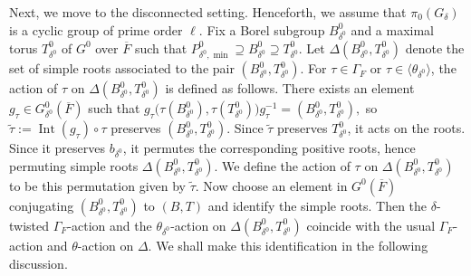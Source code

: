 \documentclass[11pt,letterpaper]{amsart}
\numberwithin{equation}{section}
\begin{document}
Next, we move to the disconnected setting. Henceforth, we assume that $\pi_0(G_{\delta})$ is a cyclic group of prime order $\ell$. 
Fix a Borel subgroup $B^0_{\delta^0}$ and a maximal torus $T^0_{\delta^0}$ of $G^0$ over $\overline{F}$ such that
$
P_{\delta^0,\min}^0 \supseteq B^0_{\delta^0} \supseteq T^0_{\delta^0}.$
Let $\Delta(B^0_{\delta^0},T^0_{\delta^0})$ denote the set of simple roots associated to the pair $(B^0_{\delta^0},T^0_{\delta^0})$.
For $\tau \in \Gamma_F$ or $\tau \in \langle \theta_{\delta^0} \rangle$, the action of $\tau$ on $\Delta(B^0_{\delta^0},T^0_{\delta^0})$ is defined as follows. There exists an element $g_{\tau} \in G_{\delta^0}^0(\overline{F})$ such that
$
g_{\tau}\bigl(\tau(B^0_{\delta^0}),\tau(T^0_{\delta^0})\bigr)g_{\tau}^{-1}
=
(B^0_{\delta^0},T^0_{\delta^0}),
$ so $\widetilde{\tau}:= \operatorname{Int}(g_{\tau}) \circ \tau$ preserves $(B^0_{\delta^0},T^0_{\delta^0})$. Since $\widetilde{\tau}$ preserves $T^0_{\delta^0}$, it acts on the roots. Since it preserves $b_{\delta^0}$, it permutes the corresponding positive roots, hence permuting simple roots $\Delta(B^0_{\delta^0},T^0_{\delta^0})$. We define the action of  $\tau$ on $\Delta(B^0_{\delta^0},T^0_{\delta^0})$ to be this permutation given by $\widetilde{\tau}$. 
Now choose an element in $G^0(\overline{F})$ conjugating $(B^0_{\delta^0},T^0_{\delta^0})$ to $(B,T)$ and identify the simple roots. Then the $\delta$-twisted $\Gamma_F$-action and the $\theta_{\delta^0}$-action on $\Delta(B^0_{\delta^0},T^0_{\delta^0})$ coincide with the usual $\Gamma_F$-action and $\theta$-action on $\Delta$. We shall make this identification in the following discussion.
\end{document}
